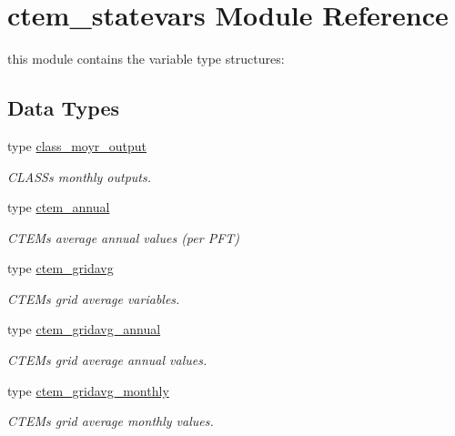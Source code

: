 \hypertarget{namespacectem__statevars}{}\section{ctem\+\_\+statevars Module Reference}
\label{namespacectem__statevars}


this module contains the variable type structures\+:  


\subsection*{Data Types}
\begin{DoxyCompactItemize}
\item 
type \hyperlink{structctem__statevars_1_1class__moyr__output}{class\+\_\+moyr\+\_\+output}
\begin{DoxyCompactList}\small\item\em C\+L\+A\+S\+S\textquotesingle{}s monthly outputs. \end{DoxyCompactList}\item 
type \hyperlink{structctem__statevars_1_1ctem__annual}{ctem\+\_\+annual}
\begin{DoxyCompactList}\small\item\em C\+T\+E\+M\textquotesingle{}s average annual values (per P\+F\+T) \end{DoxyCompactList}\item 
type \hyperlink{structctem__statevars_1_1ctem__gridavg}{ctem\+\_\+gridavg}
\begin{DoxyCompactList}\small\item\em C\+T\+E\+M\textquotesingle{}s grid average variables. \end{DoxyCompactList}\item 
type \hyperlink{structctem__statevars_1_1ctem__gridavg__annual}{ctem\+\_\+gridavg\+\_\+annual}
\begin{DoxyCompactList}\small\item\em C\+T\+E\+M\textquotesingle{}s grid average annual values. \end{DoxyCompactList}\item 
type \hyperlink{structctem__statevars_1_1ctem__gridavg__monthly}{ctem\+\_\+gridavg\+\_\+monthly}
\begin{DoxyCompactList}\small\item\em C\+T\+E\+M\textquotesingle{}s grid average monthly values. \end{DoxyCompactList}\item 

\end{DoxyCompactItemize}

